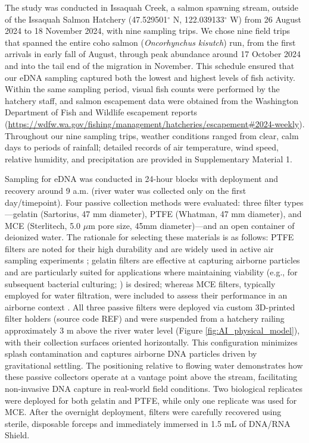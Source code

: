 \documentclass{article}
\begin{document}
The study was conducted in Issaquah Creek, a salmon spawning stream, outside of the Issaquah Salmon Hatchery (47.529501$^\circ$ N, 122.039133$^\circ$ W) from 26 August 2024 to 18 November 2024, with nine sampling trips. We chose nine field trips that spanned the entire coho salmon (\textit{Oncorhynchus kisutch}) run, from the first arrivals in early fall of August, through peak abundance around 17 October 2024 and into the tail end of the migration in November. This schedule ensured that our eDNA sampling captured both the lowest and highest levels of fish activity. Within the same sampling period, visual fish counts were performed by the hatchery staff, and salmon escapement data were obtained from the Washington Department of Fish and Wildlife escapement reports (\href{https://wdfw.wa.gov/fishing/management/hatcheries/escapement#2024-weekly}{https://wdfw.wa.gov/fishing/management/hatcheries/escapement\#2024-weekly}). Throughout our nine sampling trips, weather conditions ranged from clear, calm days to periods of  rainfall; detailed records of air temperature, wind speed, relative humidity, and precipitation are provided in Supplementary Material 1.

Sampling for eDNA was conducted in 24-hour blocks with deployment and recovery around 9 a.m. (river water was collected only on the first day/timepoint). Four passive collection methods were evaluated: three filter types—gelatin (Sartorius, 47 mm diameter), PTFE (Whatman, 47 mm diameter), and MCE (Sterlitech, 5.0 $\mu$m pore size, 45mm diameter)—and an open container of deionized water. The rationale for selecting these materials is as follows: PTFE filters are noted for their high durability and are widely used in active air sampling experiments \cite{harnpicharnchai2023}; gelatin filters are effective at capturing airborne particles and are particularly suited for applications where maintaining viability (e.g., for subsequent bacterial culturing; \cite{wu2010}) is desired; whereas MCE filters, typically employed for water filtration, were included to assess their performance in an airborne context \cite{allan2023}. All three passive filters were deployed via custom 3D-printed filter holders (source code REF) and were suspended from a hatchery railing approximately 3 m above the river water level (Figure \ref{fig:AI_physical_model}), with their collection surfaces oriented horizontally. This configuration minimizes splash contamination and captures airborne DNA particles driven by gravitational settling. The positioning relative to flowing water demonstrates how these passive collectors operate at a vantage point above the stream, facilitating non-invasive DNA capture in real-world field conditions. Two biological replicates were deployed for both gelatin and PTFE, while only one replicate was used for MCE. After the overnight deployment, filters were carefully recovered using sterile, disposable forceps and immediately immersed in 1.5 mL of DNA/RNA Shield. 
\end{document}
